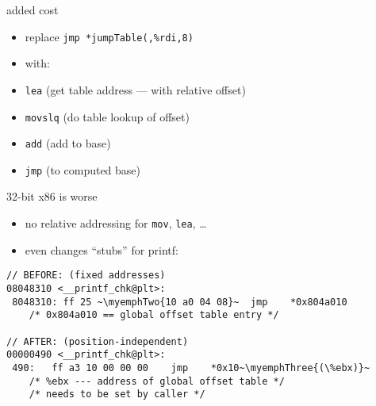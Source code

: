 \begin{frame}{added cost}
\begin{itemize}
    \item replace \texttt{jmp *jumpTable(,\%rdi,8)}
    \vspace{.5cm}
    \item with:
        \item \texttt{lea} (get table address --- with relative offset)
        \item \texttt{movslq} (do table lookup of offset)
        \item \texttt{add} (add to base)
        \item \texttt{jmp} (to computed base)
\end{itemize}

\end{frame}

\begin{frame}[fragile,label=x86Worse]{32-bit x86 is worse}
    \begin{itemize}
    \item no relative addressing for {\tt mov}, {\tt lea}, \ldots
    \item even changes ``stubs'' for printf:
    \end{itemize}
\lstset{
    language=myasm,
    style=smaller,
    escapeinside=~~,
}
\begin{lstlisting}
// BEFORE: (fixed addresses)
08048310 <__printf_chk@plt>:
 8048310: ff 25 ~\myemphTwo{10 a0 04 08}~  jmp    *0x804a010
    /* 0x804a010 == global offset table entry */

// AFTER: (position-independent)
00000490 <__printf_chk@plt>:
 490:	ff a3 10 00 00 00    jmp    *0x10~\myemphThree{(\%ebx)}~
    /* %ebx --- address of global offset table */
    /* needs to be set by caller */
\end{lstlisting}
\end{frame}

